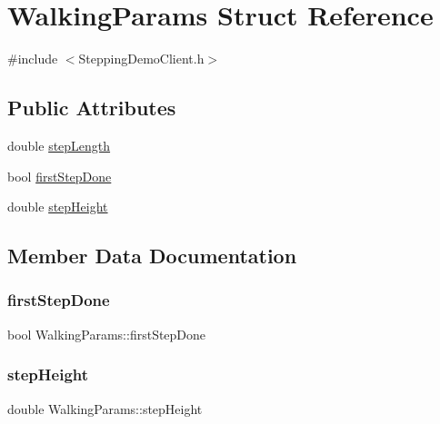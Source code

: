 \hypertarget{structWalkingParams}{}\section{Walking\+Params Struct Reference}
\label{structWalkingParams}


{\ttfamily \#include $<$Stepping\+Demo\+Client.\+h$>$}

\subsection*{Public Attributes}
\begin{DoxyCompactItemize}
\item 
double \hyperlink{structWalkingParams_ad719bbe7ba3ed5ad027d0c42522693d7}{step\+Length}
\item 
bool \hyperlink{structWalkingParams_ae7de2cc6083d12bbfb2f66772f808b56}{first\+Step\+Done}
\item 
double \hyperlink{structWalkingParams_abfc5b4af75225435731b30bcd882a0ae}{step\+Height}
\end{DoxyCompactItemize}


\subsection{Member Data Documentation}
\hypertarget{structWalkingParams_ae7de2cc6083d12bbfb2f66772f808b56}{}\label{structWalkingParams_ae7de2cc6083d12bbfb2f66772f808b56} 
\subsubsection{\texorpdfstring{first\+Step\+Done}{firstStepDone}}
{\footnotesize\ttfamily bool Walking\+Params\+::first\+Step\+Done}

\hypertarget{structWalkingParams_abfc5b4af75225435731b30bcd882a0ae}{}\label{structWalkingParams_abfc5b4af75225435731b30bcd882a0ae} 
\subsubsection{\texorpdfstring{step\+Height}{stepHeight}}
{\footnotesize\ttfamily double Walking\+Params\+::step\+Height}

